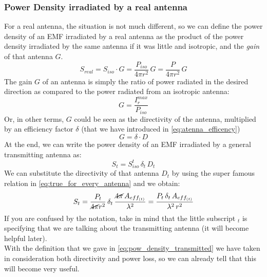\subsubsection*{Power Density irradiated by a real antenna}
For a real antenna, the situation is not much different, so we can define the power density of an EMF irradiated by a real antenna as the product of the power density irradiated by the same antenna if it was little and isotropic, and the \emph{gain} of that antenna $G$.
\begin{equation}
    S_{real}=S_{iso}\cdot G=\frac{P_{iso}}{4\pi r^2}\, G=\frac{P}{4\pi r^2}\, G
\end{equation}
The gain $G$ of an antenna is simply the ratio of power radiated in the desired direction as compared to the power radiated from an isotropic antenna:
\begin{equation}
    G=\frac{I_r^{max}}{P_{iso}}
\end{equation}
Or, in other terms, $G$ could be seen as the directivity of the antenna, multiplied by an efficiency factor $\delta$ (that we have introduced in \cref{eq:atenna_efficency})
\begin{equation}\label{eq:gain_def}
    G=\delta\cdot D
\end{equation}
At the end, we can write the power density of an EMF irradiated by a general transmitting antenna as:
\begin{equation}\label{eq:gain_in_friis}
    S_t=S_{iso}^t\,\delta_t\,D_t
\end{equation}
We can substitute the directivity of that antenna $D_t$ by using the super famous relation in \cref{eq:true_for_every_antenna} and we obtain:
\begin{equation}\label{eq:pow_density_transmitted}
    S_t=\frac{P_t}{\cancel{4\pi} r^2}\,\delta_t\,\frac{\cancel{4\pi}\,A_{eff_{(t)}}}{\lambda^2}=\frac{P_t\,\delta_t\,A_{eff_{(t)}}}{\lambda^2 \, r^2}
\end{equation}
If you are confused by the notation, take in mind that the little subscript $_t$ is specifying that we are talking about the transmitting antenna (it will become helpful later).\\
With the definition that we gave in \cref{eq:pow_density_transmitted} we have taken in consideration both directivity and power loss, so we can already tell that this will become very useful.
